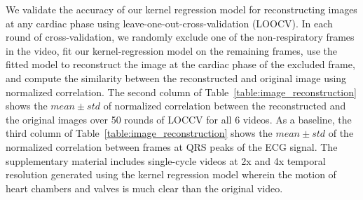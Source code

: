 \documentclass[runningheads,a4paper]{llncs}
\begin{document}
	We validate the accuracy of our kernel regression model for reconstructing images at any cardiac phase using leave-one-out-cross-validation (LOOCV). In each round of cross-validation, we randomly exclude one of the non-respiratory frames in the video, fit our kernel-regression model on the remaining frames, use the fitted model to reconstruct the image at the cardiac phase of the excluded frame, and compute the similarity between the reconstructed and original image using normalized correlation. The second column of Table~\ref{table:image_reconstruction} shows the $mean \pm std$ of normalized correlation between the reconstructed and the original images over 50 rounds of LOCCV for all 6 videos. As a baseline, the third column of  Table~\ref{table:image_reconstruction} shows the $mean \pm std$ of the normalized correlation between frames at QRS peaks of the ECG signal. The supplementary material includes single-cycle videos at 2x and 4x temporal resolution generated using the kernel regression model wherein the motion of heart chambers and valves is much clear than the original video. 
%
%
\end{document}
